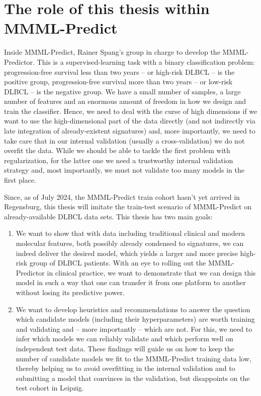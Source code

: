 \section{The role of this thesis within MMML-Predict}

Inside MMML-Predict, Rainer Spang's group in charge to develop the MMML-Predictor. This is 
a supervised-learning task with a binary classification problem: progression-free survival less than 
two years -- or high-risk DLBCL -- is the positive group, progression-free survival more than two 
years -- or low-risk DLBCL -- is the negative group. We have a small number of samples, a large 
number of features and an enormous amount of freedom in how we design and train the classifier. 
Hence, we need to deal with the curse of high dimensions if we want to use the high-dimensional part 
of the data directly (and not indirectly via late integration of already-existent signatures) and, 
more importantly, we need to take care that in our internal validation (usually a cross-validation)
we do not overfit the data. While we should be able to tackle the first problem with regularization,
for the latter one we need a trustworthy internal validation strategy and, most importantly, we 
must not validate too many models in the first place.

Since, as of July 2024, the MMML-Predict train cohort hasn't yet arrived in Regensburg, this thesis
will imitate the train-test scenario of MMML-Predict on already-available DLBCL data sets. This thesis 
has two main goals:
\begin{enumerate}
    \item We want to show that with data including traditional clinical and modern 
        molecular features, both possibly already condensed to signatures, we can indeed deliver 
        the desired model, which yields a larger and more precise high-risk group of DLBCL patients.
        With an eye to rolling out the MMML-Predictor in clinical practice, we want to demonstrate 
        that we can design this model in such a way that one can transfer it from one platform to
        another without losing its predictive power.
    \item We want to develop heuristics and recommendations to answer the question which candidate 
        models (including their hyperparameters) are worth training and validating and -- more 
        importantly -- which are not. For this, we need to infer which models we can reliably validate 
        and which perform well on independent test data. These findings will guide us on how to keep 
        the number of candidate models we fit to the MMML-Predict training data low, thereby helping 
        us to avoid overfitting in the internal validation and to submitting a model that convinces 
        in the validation, but disappoints on the test cohort in Leipzig.
\end{enumerate}